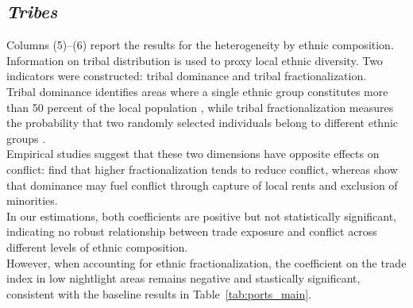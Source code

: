 \subsection{\textit{Tribes}} 
Columns (5)–(6) report the results for the heterogeneity by ethnic composition.\\
Information on tribal distribution is used to proxy local ethnic diversity.
Two indicators were constructed: tribal dominance and tribal fractionalization.\\
Tribal dominance identifies areas where a single ethnic group constitutes more than 50 percent of the local population \parencite{esteban2012ethnicity}, while tribal fractionalization measures the probability that two randomly selected individuals belong to different ethnic groups \parencite{collier2004greed, collier1998economic}.\\
Empirical studies suggest that these two dimensions have opposite effects on conflict: \textcite{esteban2012ethnicity} find that higher fractionalization tends to reduce conflict, whereas \textcite{collier2004greed} show that dominance may fuel conflict through capture of local rents and exclusion of minorities.\\
In our estimations, both coefficients are positive but not statistically significant, indicating no robust relationship between trade exposure and conflict across different levels of ethnic composition.\\
However, when accounting for ethnic fractionalization, the coefficient on the trade index in low nightlight areas remains negative and stastically significant, consistent with the baseline results in Table~\ref{tab:ports_main}.
